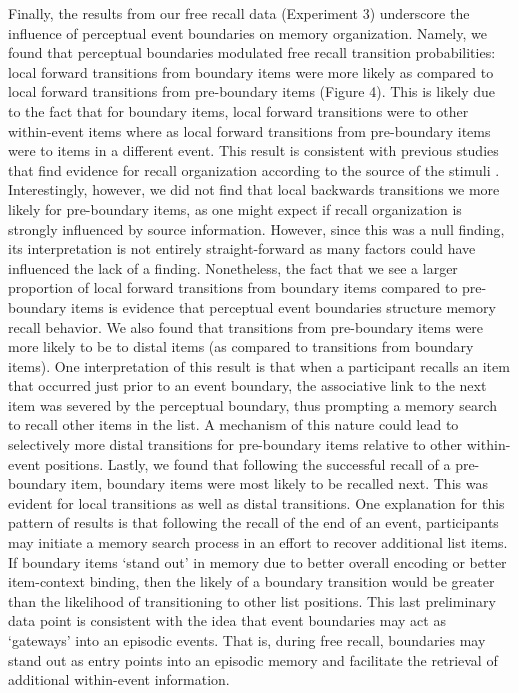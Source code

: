 Finally, the results from our free recall data (Experiment 3) underscore
the influence of perceptual event boundaries on memory organization.
Namely, we found that perceptual boundaries modulated free recall
transition probabilities: local forward transitions from boundary items
were more likely as compared to local forward transitions from
pre-boundary items (Figure 4). This is likely due to the fact that for
boundary items, local forward transitions were to other within-event
items where as local forward transitions from pre-boundary items were to
items in a different event. This result is consistent with previous
studies that find evidence for recall organization according to the
source of the stimuli
\autocites{frost_clustering_1971}{hintzman_memory_1972}{murdock_modality_1969}{nilsson_further_1974}{polyn_task_2009}.
Interestingly, however, we did not find that local backwards transitions
we more likely for pre-boundary items, as one might expect if recall
organization is strongly influenced by source information. However,
since this was a null finding, its interpretation is not entirely
straight-forward as many factors could have influenced the lack of a
finding. Nonetheless, the fact that we see a larger proportion of local
forward transitions from boundary items compared to pre-boundary items
is evidence that perceptual event boundaries structure memory recall
behavior. We also found that transitions from pre-boundary items were
more likely to be to distal items (as compared to transitions from
boundary items). One interpretation of this result is that when a
participant recalls an item that occurred just prior to an event
boundary, the associative link to the next item was severed by the
perceptual boundary, thus prompting a memory search to recall other
items in the list. A mechanism of this nature could lead to selectively
more distal transitions for pre-boundary items relative to other
within-event positions. Lastly, we found that following the successful
recall of a pre-boundary item, boundary items were most likely to be
recalled next. This was evident for local transitions as well as distal
transitions. One explanation for this pattern of results is that
following the recall of the end of an event, participants may initiate a
memory search process in an effort to recover additional list items. If
boundary items `stand out' in memory due to better overall encoding or
better item-context binding, then the likely of a boundary transition
would be greater than the likelihood of transitioning to other list
positions. This last preliminary data point is consistent with the idea
that event boundaries may act as `gateways' into an episodic events.
That is, during free recall, boundaries may stand out as entry points
into an episodic memory and facilitate the retrieval of additional
within-event information.

